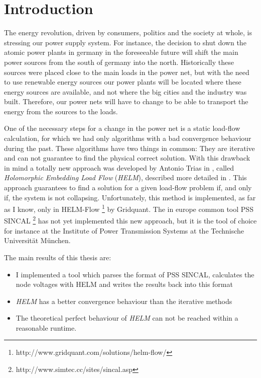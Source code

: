 \chapter{Introduction}
The energy revolution, driven by consumers, politics and the society at whole, is stressing our power supply system. For instance, the decision to shut down the atomic power plants in germany in the foreseeable future will shift the main power sources from the south of germany into the north. Historically these sources were placed close to the main loads in the power net, but with the need to use renewable energy sources our power plants will be located where these energy sources are available, and not where the big cities and the industry was built. Therefore, our power nets will have to change to be able to transport the energy from the sources to the loads.

One of the necessary steps for a change in the power net is a static load-flow calculation, for which we had only algorithms with a bad convergence behaviour during the past. These algorithms have two things in common: They are iterative and can not guarantee to find the physical correct solution. With this drawback in mind a totally new approach was developed by Antonio Trias in \citep{helmIEEE}, called \emph{Holomorphic Embedding Load Flow} (\emph{HELM}), described more detailed in . This approach guarantees to find a solution for a given load-flow problem if, and only if, the system is not collapsing. Unfortunately, this method is implemented, as far as I know, only in HELM-Flow \footnote{http://www.gridquant.com/solutions/helm-flow/} by Gridquant. The in europe common tool PSS SINCAL \footnote{http://www.simtec.cc/sites/sincal.asp} has not yet implemented this new approach, but it is the tool of choice for instance at the Institute of Power Transmission Systems at the Technische Universität München. 

The main results of this thesis are:
\begin{itemize}
	\item I implemented a tool which parses the format of PSS SINCAL, calculates the node voltages with HELM and writes the results back into this format
	\item \emph{HELM} has a better convergence behaviour than the iterative methods
	\item The theoretical perfect behaviour of \emph{HELM} can not be reached within a reasonable runtime.
\end{itemize}